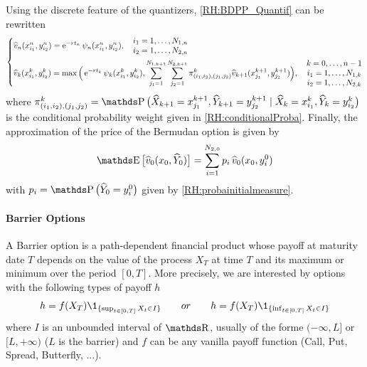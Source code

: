 \medskip
Using the discrete feature of the quantizers, \eqref{RH:BDPP_Quantif} can be rewritten
\begin{equation} \label{RH:BDPP_Quantif_num} \left\{
	\begin{aligned}
		 & \widehat v_n ( x_{i_1}^n, y_{i_2}^n ) = \operatorname{e}^{ - r t_n }  \psi_n ( x_{i_1}^n, y_{i_2}^n )
		,\quad
		\begin{matrix}
			i_1 = 1, \dots, N_{1,n} \\
			i_2 = 1, \dots, N_{2,n}
		\end{matrix}
		\\
		 & \widehat v_k ( x_{i_1}^k, y_{i_2}^k ) = \max \Big( \operatorname{e}^{ - r t_k } \psi_k ( x_{i_1}^k, y_{i_2}^k ), \sum_{j_1 = 1}^{N_{1,k+1}} \sum_{j_2 = 1}^{N_{2,k+1}} \pi_{(i_1,i_2),(j_1,j_2)}^k \widehat{v}_{k+1} ( x_{j_1}^{k+1}, y_{j_2}^{k+1} ) \Big)
		, \quad
		\begin{matrix}
			k = 0, \dots, n-1       \\
			i_1 = 1, \dots, N_{1,k} \\
			i_2 = 1, \dots, N_{2,k}
		\end{matrix}
	\end{aligned} \right.
\end{equation}
where $ \pi_{(i_1,i_2),(j_1,j_2)}^k = \Prob \big( \widehat X_{k+1} = x_{j_1}^{k+1}, \widehat Y_{k+1} = y_{j_2}^{k+1} \mid \widehat X_k = x_{i_1}^k, \widehat Y_k = y_{i_2}^k \big)$ is the conditional probability weight given in \eqref{RH:conditionalProba}. Finally, the approximation of the price of the Bermudan option is given by
\begin{equation}
	\E \big[ \widehat v_0 ( x_0, \widehat Y_0 ) \big] = \sum_{i=1}^{N_{2,0}} p_i \, \widehat v_0 ( x_0, y_i^0 )
\end{equation}
with $p_i = \Prob \big( \widehat Y_0 = y_i^0 \big)$ given by \eqref{RH:probainitialmeasure}.


\paragraph{Barrier Options}

A Barrier option is a path-dependent financial product whose payoff at maturity date $T$ depends on the value of the process $X_T$ at time $T$ and its maximum or minimum over the period $[0,T]$. More precisely, we are interested by options with the following types of payoff $h$
\begin{equation}
	h = f(X_T) \1_{ \{ \sup_{t \in [0,T]} X_t \in I \} }\qquad or \qquad h = f(X_T) \1_{ \{ \inf_{t \in [0,T]} X_t \in I \} }
\end{equation}
where $I$ is an unbounded interval of $\R$, usually of the forme $(- \infty, L]$ or $[L, + \infty)$ ($L$ is the barrier) and $f$ can be any vanilla payoff function (Call, Put, Spread, Butterfly, ...).

